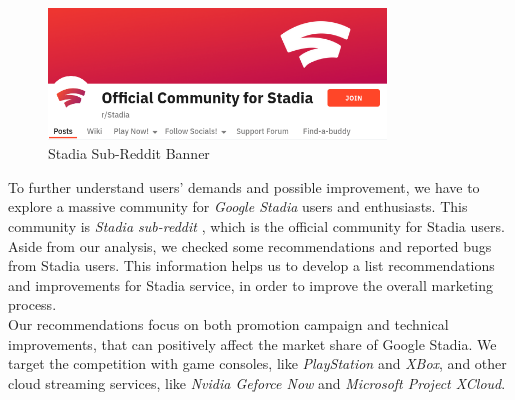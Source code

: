 \begin{figure}[h]
    \centering
    \includegraphics[width=0.8\textwidth]{images/reddit.png}
    \caption{Stadia Sub-Reddit Banner}
    \label{fig:reddit}
\end{figure}

To further understand users' demands and possible improvement, we have to explore a massive community for \emph{Google Stadia} users and enthusiasts. This community is \emph{Stadia sub-reddit} \cite{stadia_reddit}, which is the official community for Stadia users. \\

Aside from our analysis, we checked some recommendations and reported bugs from Stadia users. This information helps us to develop a list recommendations and improvements for Stadia service, in order to improve the overall marketing process. \\

Our recommendations focus on both promotion campaign and technical improvements, that can positively affect the market share of Google Stadia. We target the competition with game consoles, like \emph{PlayStation} and \emph{XBox}, and other cloud streaming services, like \emph{Nvidia Geforce Now} and \emph{Microsoft Project XCloud}. \\

